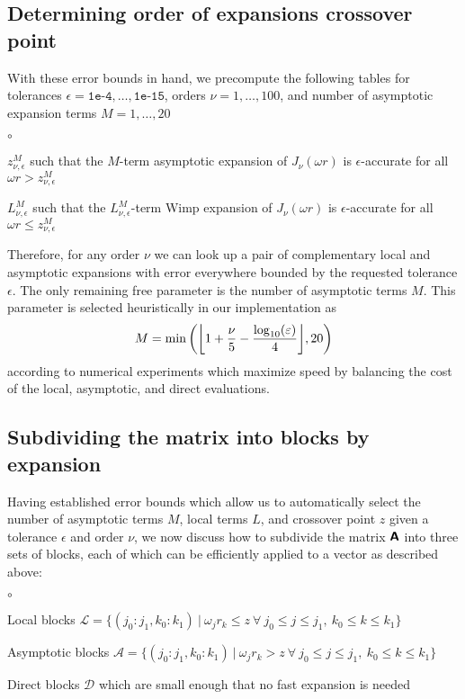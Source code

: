 

\subsection{Determining order of expansions crossover point}

With these error bounds in hand, we precompute the following tables for
tolerances $\epsilon = \texttt{1e-4}, \dots, \texttt{1e-15}$, orders $\nu = 1,
\dots, 100$, and number of asymptotic expansion terms $M = 1, \dots, 20$
\begin{list}{$\circ$}{}
    \item $z_{\nu, \epsilon}^M$ such that the $M$-term asymptotic expansion of
    $J_\nu(\omega r)$ is $\epsilon$-accurate for all $\omega r > z_{\nu,
    \epsilon}^M$
    \item $L_{\nu, \epsilon}^M$ such that the $L_{\nu, \epsilon}^M$-term Wimp
    expansion of $J_\nu(\omega r)$ is $\epsilon$-accurate for all $\omega r \leq
    z_{\nu, \epsilon}^M$
\end{list}
Therefore, for any order $\nu$ we can look up a pair of complementary local and
asymptotic expansions with error everywhere bounded by the requested tolerance
$\epsilon$. The only remaining free parameter is the number of asymptotic terms
$M$. This parameter is selected heuristically in our implementation as 
\begin{align} \label{eq:num-asy-terms}
    M = \min\left(\flr{1 + \frac{\nu}{5} - \frac{\log_{10}(\epsilon)}{4}}, 20\right)
\end{align}
according to numerical experiments which maximize speed by balancing the cost of
the local, asymptotic, and direct evaluations.

\subsection{Subdividing the matrix into blocks by expansion}

Having established error bounds which allow us to automatically select the
number of asymptotic terms $M$, local terms $L$, and crossover point $z$ given a
tolerance $\epsilon$ and order $\nu$, we now discuss how to subdivide the matrix
$\bm{\mathsf{A}}$ into three sets of blocks, each of which can be efficiently applied to
a vector as described above:
\begin{list}{$\circ$}{}
    \item Local blocks $\mathscr{L} = \big\{ (j_0:j_1, k_0:k_1) \ | \ \omega_j
    r_k \leq z \ \forall \ j_0 \leq j \leq j_1, \ k_0 \leq k \leq k_1 \big\}$
    \item Asymptotic blocks $\mathscr{A} = \big\{ (j_0:j_1, k_0:k_1) \ | \
    \omega_j r_k > z \ \forall \ j_0 \leq j \leq j_1, \ k_0 \leq k \leq k_1
    \big\}$
    \item Direct blocks $\mathscr{D}$ which are small enough that no fast
    expansion is needed
\end{list}


